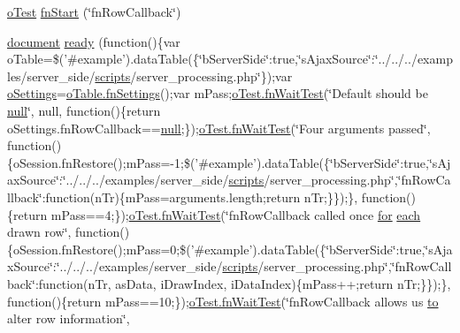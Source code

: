 \begin{DoxyCompactItemize}
\item 
\hyperlink{unit__test_8js_a3b2d259e2df3b6860d9047a92d09d0d6}{o\+Test} \hyperlink{4__server-side_2fn_row_callback_8js_ac4be0addcbe9445155bc58b475470644}{fn\+Start} (\char`\"{}fn\+Row\+Callback\char`\"{})
\item 
\hyperlink{outside_events_8js_aa14f8e0338cced6720590fd2ea13bd4b}{document} \hyperlink{4__server-side_2fn_row_callback_8js_a9d1f8df11e1f28fff2e621b4fce51e75}{ready} (function()\{var o\+Table=\$('\#example').data\+Table(\{\char`\"{}b\+Server\+Side\char`\"{}\+:true,\char`\"{}s\+Ajax\+Source\char`\"{}\+:\char`\"{}../../../examples/server\+\_\+side/\hyperlink{tinymce_8jquery_8dev_8js_a09066d4d580eeec222f858d588b4cdef}{scripts}/server\+\_\+processing.\+php\char`\"{}\});var \hyperlink{model_8settings_8js_a4857b9c813b4dea010668e9555d0aca7}{o\+Settings}=\hyperlink{api_8methods_8js_a78f387fab92a85c2cb7830bc5d8a6141}{o\+Table.\+fn\+Settings}();var m\+Pass;\hyperlink{onhold_24__server-side_2__zero__config_8js_ab25c4d596771c0133cdc45178ce72c3d}{o\+Test.\+fn\+Wait\+Test}(\char`\"{}Default should be \hyperlink{validate_8js_afb8e110345c45e74478894341ab6b28e}{null}\char`\"{}, null, function()\{return o\+Settings.\+fn\+Row\+Callback==\hyperlink{validate_8js_afb8e110345c45e74478894341ab6b28e}{null};\});\hyperlink{onhold_24__server-side_2__zero__config_8js_ab25c4d596771c0133cdc45178ce72c3d}{o\+Test.\+fn\+Wait\+Test}(\char`\"{}Four arguments passed\char`\"{}, function()\{o\+Session.\+fn\+Restore();m\+Pass=-\/1;\$('\#example').data\+Table(\{\char`\"{}b\+Server\+Side\char`\"{}\+:true,\char`\"{}s\+Ajax\+Source\char`\"{}\+:\char`\"{}../../../examples/server\+\_\+side/\hyperlink{tinymce_8jquery_8dev_8js_a09066d4d580eeec222f858d588b4cdef}{scripts}/server\+\_\+processing.\+php\char`\"{},\char`\"{}fn\+Row\+Callback\char`\"{}\+:function(n\+Tr)\{m\+Pass=arguments.\+length;return n\+Tr;\}\});\}, function()\{return m\+Pass==4;\});\hyperlink{onhold_24__server-side_2__zero__config_8js_ab25c4d596771c0133cdc45178ce72c3d}{o\+Test.\+fn\+Wait\+Test}(\char`\"{}fn\+Row\+Callback called once \hyperlink{tinymce_8jquery_8dev_8js_a4675a875b20881bc5f7011f49fbd4da7}{for} \hyperlink{fullpage_2plugin_8min_8js_a536422939f8cd6b5867a8fb424c3c02e}{each} drawn row\char`\"{}, function()\{o\+Session.\+fn\+Restore();m\+Pass=0;\$('\#example').data\+Table(\{\char`\"{}b\+Server\+Side\char`\"{}\+:true,\char`\"{}s\+Ajax\+Source\char`\"{}\+:\char`\"{}../../../examples/server\+\_\+side/\hyperlink{tinymce_8jquery_8dev_8js_a09066d4d580eeec222f858d588b4cdef}{scripts}/server\+\_\+processing.\+php\char`\"{},\char`\"{}fn\+Row\+Callback\char`\"{}\+:function(n\+Tr, as\+Data, i\+Draw\+Index, i\+Data\+Index)\{m\+Pass++;return n\+Tr;\}\});\}, function()\{return m\+Pass==10;\});\hyperlink{onhold_24__server-side_2__zero__config_8js_ab25c4d596771c0133cdc45178ce72c3d}{o\+Test.\+fn\+Wait\+Test}(\char`\"{}fn\+Row\+Callback allows us \hyperlink{jquery-ui_8js_af6086621f45baa2cf538f19e45d3c263}{to} alter row information\char`\"{}, 
\end{DoxyCompactItemize}
